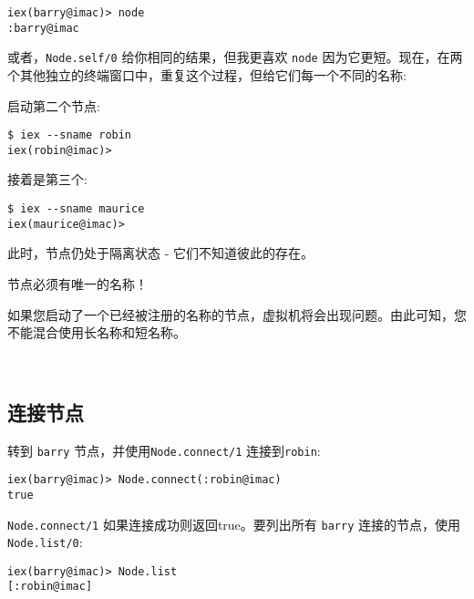 \begin{code}{}
\begin{verbatim}
iex(barry@imac)> node
:barry@imac
\end{verbatim}
\end{code}

或者，\texttt{Node.self/0} 给你相同的结果，但我更喜欢
\texttt{node}
因为它更短。现在，在两个其他独立的终端窗口中，重复这个过程，但给它们每一个不同的名称:

启动第二个节点:

\begin{code}{}
\begin{verbatim}
$ iex --sname robin
iex(robin@imac)>
\end{verbatim}
\end{code}

接着是第三个:

\begin{code}{}
\begin{verbatim}
$ iex --sname maurice
iex(maurice@imac)>
\end{verbatim}
\end{code}

此时，节点仍处于隔离状态 - 它们不知道彼此的存在。

节点必须有唯一的名称！

如果您启动了一个已经被注册的名称的节点，虚拟机将会出现问题。由此可知，您不能混合使用长名称和短名称。

~

\subsection{连接节点}

转到 \texttt{barry} 节点，并使用\texttt{Node.connect/1} 连接到\texttt{robin}:

\begin{code}{}
\begin{verbatim}
iex(barry@imac)> Node.connect(:robin@imac)
true
\end{verbatim}
\end{code}

\texttt{Node.connect/1} 如果连接成功则返回true。要列出所有 \texttt{barry} 连接的节点，使用\texttt{Node.list/0}:

\begin{code}{}
\begin{verbatim}
iex(barry@imac)> Node.list
[:robin@imac]
\end{verbatim}
\end{code}

